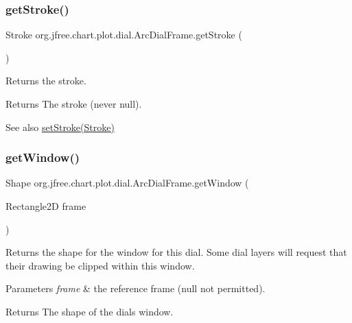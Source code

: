 \subsubsection{\texorpdfstring{get\+Stroke()}{getStroke()}}
{\footnotesize\ttfamily Stroke org.\+jfree.\+chart.\+plot.\+dial.\+Arc\+Dial\+Frame.\+get\+Stroke (\begin{DoxyParamCaption}{ }\end{DoxyParamCaption})}

Returns the stroke.

\begin{DoxyReturn}{Returns}
The stroke (never {\ttfamily null}).
\end{DoxyReturn}
\begin{DoxySeeAlso}{See also}
\mbox{\hyperlink{classorg_1_1jfree_1_1chart_1_1plot_1_1dial_1_1_arc_dial_frame_a3b03da2588e0393015a12a9f69d34bb7}{set\+Stroke(\+Stroke)}} 
\end{DoxySeeAlso}
\mbox{\label{classorg_1_1jfree_1_1chart_1_1plot_1_1dial_1_1_arc_dial_frame_a60aef0f1dc5859e5d1684d8587c3652d}} 
\subsubsection{\texorpdfstring{get\+Window()}{getWindow()}}
{\footnotesize\ttfamily Shape org.\+jfree.\+chart.\+plot.\+dial.\+Arc\+Dial\+Frame.\+get\+Window (\begin{DoxyParamCaption}\item[{Rectangle2D}]{frame }\end{DoxyParamCaption})}

Returns the shape for the window for this dial. Some dial layers will request that their drawing be clipped within this window.


\begin{DoxyParams}{Parameters}
{\em frame} & the reference frame ({\ttfamily null} not permitted).\\
\hline
\end{DoxyParams}
\begin{DoxyReturn}{Returns}
The shape of the dial\textquotesingle{}s window. 
\end{DoxyReturn}


